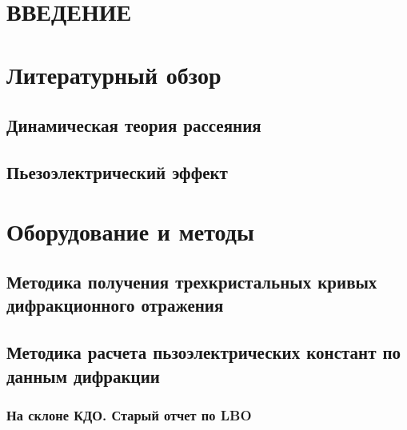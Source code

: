 \documentclass[pdftex,a4paper,14pt,english,russian]{extarticle}
\numberwithin{equation}{subsection}
\begin{document}


\setcounter{page}{5}
\begin{center}
\tableofcontents
\end{center}

\newpage

\section*{ \centering ВВЕДЕНИЕ }
  
  \newpage
\section{Литературный обзор}
  
  
  
  \subsection{Динамическая теория рассеяния}
    
    
    
    
    
  \subsection{Пьезоэлектрический эффект}
    
\newpage
\section{Оборудование и методы}
  
  
  
  \subsection{Методика получения трехкристальных кривых дифракционного отражения}
    
    
  \subsection{Методика расчета пьзоэлектрических констант по данным дифракции}
  
  \subsubsection{На склоне КДО. Старый отчет по LBO}

  
\end{document}
